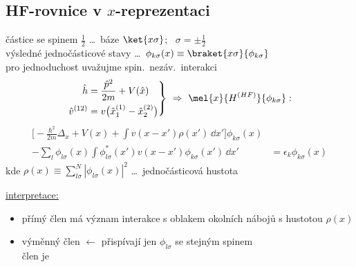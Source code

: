 \subsection*{HF-rovnice v $x$-reprezentaci}
částice se spinem $\frac12$ \dots\ báze $\ket{x\sigma}$; \ $\sigma = \pm\frac12$ \\
výsledné jednočásticové stavy \dots\ $\phi_{k\sigma}(x) \equiv \braket{x\sigma}{\phi_{k\sigma}}$ \\
pro jednoduchost uvažujme spin.\ nezáv.\ interakci
\[
  \left.\begin{aligned}
    \hat h &= \frac{\hat p^2}{2m} + V(\hat x) \\
    \hat v^{(12)} &= v\big(\hat x_1^{(1)} - \hat x_2^{(2)}\big)
  \end{aligned}\right\}
  \ \Rightarrow\ \mel{x}{H^{(HF)}}{\phi_{k\sigma}}:
\]
\begin{align*}
  \Big[-\frac{\hbar^2}{2m}\Delta_x + V(x) + \int v(x - x')\rho(x')\,\dd x'\Big]\phi_{k\sigma}(x)& \\
  - \sum_l\phi_{l\sigma}(x)\int\phi_{l\sigma}^*(x')v(x - x')\phi_{k\sigma}(x')\,\dd x' &= \epsilon_k\phi_{k\sigma}(x)
\end{align*}
kde \quad $\rho(x) \equiv \sum_{l\sigma}^{N}|\phi_{l\sigma}(x)|^2$ \quad \dots\ jednočásticová hustota


\underline{interpretace:}
\begin{itemize}[nosep]
  \item přímý člen má význam interakce s oblakem okolních nábojů s hustotou $\rho(x)$
  \item výměnný člen $\leftarrow$ přispívají jen $\phi_{l\sigma}$ se stejným spinem \\
        člen je 
\end{itemize}

